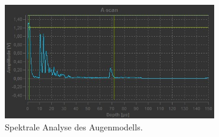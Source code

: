 \begin{figure}
  \centering
  \includegraphics[height = 5cm]{FFS-Data/a_scan_auge.jpg}
  \caption{Spektrale Analyse des Augenmodells.}
  \label{fig:AU}
\end{figure}
